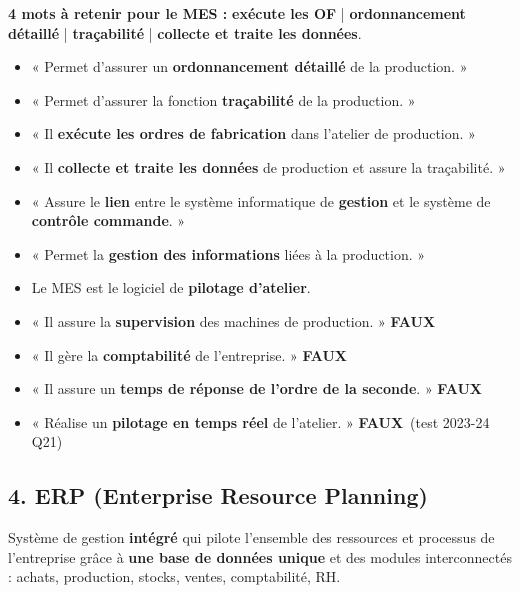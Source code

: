\documentclass[11pt,a4paper]{article}
\newcommand{\faux}{\textcolor{rouge}{\textbf{FAUX}}}
\begin{document}
\begin{note}
\textbf{4 mots à retenir pour le MES :} \textbf{exécute les OF} \;|\; \textbf{ordonnancement détaillé} \;|\; \textbf{traçabilité} \;|\; \textbf{collecte et traite les données}.
\end{note}
\begin{examen}
\begin{itemize}
\item « Permet d'assurer un \textbf{ordonnancement détaillé} de la production. »
\item « Permet d'assurer la fonction \textbf{traçabilité} de la production. »
\item « Il \textbf{exécute les ordres de fabrication} dans l'atelier de production. »
\item « Il \textbf{collecte et traite les données} de production et assure la traçabilité. »
\item « Assure le \textbf{lien} entre le système informatique de \textbf{gestion} et le système de \textbf{contrôle commande}. »
\item « Permet la \textbf{gestion des informations} liées à la production. »
\item Le MES est le logiciel de \textbf{pilotage d'atelier}.
\end{itemize}
\end{examen}
\begin{piege}
\begin{itemize}
\item « Il assure la \textbf{supervision} des machines de production. » \faux
\item « Il gère la \textbf{comptabilité} de l'entreprise. » \faux
\item « Il assure un \textbf{temps de réponse de l'ordre de la seconde}. » \faux
\item « Réalise un \textbf{pilotage en temps réel} de l'atelier. » \faux \ (test 2023-24 Q21)
\end{itemize}
\end{piege}

\subsection*{4. ERP (Enterprise Resource Planning)}
Système de gestion \textbf{intégré} qui pilote l'ensemble des ressources et processus de l'entreprise grâce à \textbf{une base de données unique} et des modules interconnectés : achats, production, stocks, ventes, comptabilité, RH.
\end{document}
